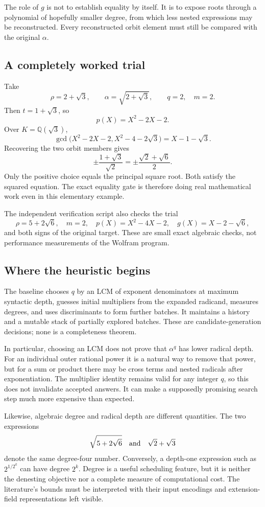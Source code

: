 \documentclass[11pt,letterpaper]{article}
\newcommand{\Q}{\mathbb{Q}}
\theoremstyle{definition}
\theoremstyle{remark}
\begin{document}
The role of $g$ is not to establish equality by itself. It is to expose roots through a polynomial of hopefully smaller degree, from which less nested expressions may be reconstructed. Every reconstructed orbit element must still be compared with the original $\alpha$.

\subsection{A completely worked trial}

Take
\[
\rho=2+\sqrt3,\qquad \alpha=\sqrt{2+\sqrt3},\qquad q=2,\quad m=2.
\]
Then $t=1+\sqrt3$, so
\[
p(X)=X^2-2X-2.
\]
Over $K=\Q(\sqrt3)$,
\[
\gcd\bigl(X^2-2X-2,X^2-4-2\sqrt3\bigr)
=X-1-\sqrt3.
\]
Recovering the two orbit members gives
\[
\pm\frac{1+\sqrt3}{\sqrt2}
=\pm\frac{\sqrt2+\sqrt6}{2}.
\]
Only the positive choice equals the principal square root. Both satisfy the squared equation. The exact equality gate is therefore doing real mathematical work even in this elementary example.

The independent verification script also checks the trial
\[
\rho=5+2\sqrt6,\quad m=2,\quad
p(X)=X^2-4X-2,\quad g(X)=X-2-\sqrt6,
\]
and both signs of the original target. These are small exact algebraic checks, not performance measurements of the Wolfram program.

\subsection{Where the heuristic begins}

The baseline chooses $q$ by an LCM of exponent denominators at maximum syntactic depth, guesses initial multipliers from the expanded radicand, measures degrees, and uses discriminants to form further batches. It maintains a history and a mutable stack of partially explored batches. These are candidate-generation decisions; none is a completeness theorem.\cite{baseline}

In particular, choosing an LCM does not prove that $\alpha^q$ has lower radical depth. For an individual outer rational power it is a natural way to remove that power, but for a sum or product there may be cross terms and nested radicals after exponentiation. The multiplier identity remains valid for any integer $q$, so this does not invalidate accepted answers. It can make a supposedly promising search step much more expensive than expected.

Likewise, algebraic degree and radical depth are different quantities. The two expressions
\[
\sqrt{5+2\sqrt6}\quad\hbox{and}\quad\sqrt2+\sqrt3
\]
denote the same degree-four number. Conversely, a depth-one expression such as $2^{1/2^k}$ can have degree $2^k$. Degree is a useful scheduling feature, but it is neither the denesting objective nor a complete measure of computational cost. The literature's bounds must be interpreted with their input encodings and extension-field representations left visible.\cite{report,landau,jeffrey}
\end{document}
